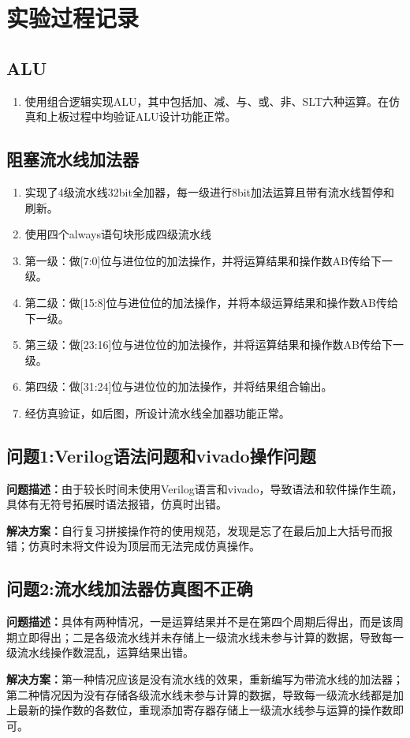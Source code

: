 \newpage
\section{实验过程记录}
\subsection{ALU}
\begin{enumerate}
    \item 使用组合逻辑实现ALU，其中包括加、减、与、或、非、SLT六种运算。在仿真和上板过程中均验证ALU设计功能正常。
\end{enumerate}

\subsection{阻塞流水线加法器}
\begin{enumerate}
    \item 实现了4级流水线32bit全加器，每一级进行8bit加法运算且带有流水线暂停和刷新。
    \item 使用四个always语句块形成四级流水线
    \item 第一级：做[7:0]位与进位位的加法操作，并将运算结果和操作数AB传给下一级。
    \item 第二级：做[15:8]位与进位位的加法操作，并将本级运算结果和操作数AB传给下一级。
    \item 第三级：做[23:16]位与进位位的加法操作，并将运算结果和操作数AB传给下一级。
    \item 第四级：做[31:24]位与进位位的加法操作，并将结果组合输出。
    \item 经仿真验证，如后图，所设计流水线全加器功能正常。
\end{enumerate}

\subsection{问题1:Verilog语法问题和vivado操作问题}
\textbf{问题描述：}由于较长时间未使用Verilog语言和vivado，导致语法和软件操作生疏，具体有无符号拓展时语法报错，仿真时出错。

\textbf{解决方案：}自行复习拼接操作符的使用规范，发现是忘了在最后加上大括号而报错；仿真时未将文件设为顶层而无法完成仿真操作。

\subsection{问题2:流水线加法器仿真图不正确}
\textbf{问题描述：}具体有两种情况，一是运算结果并不是在第四个周期后得出，而是该周期立即得出；二是各级流水线并未存储上一级流水线未参与计算的数据，导致每一级流水线操作数混乱，运算结果出错。

\textbf{解决方案：}第一种情况应该是没有流水线的效果，重新编写为带流水线的加法器；第二种情况因为没有存储各级流水线未参与计算的数据，导致每一级流水线都是加上最新的操作数的各数位，重现添加寄存器存储上一级流水线参与运算的操作数即可。